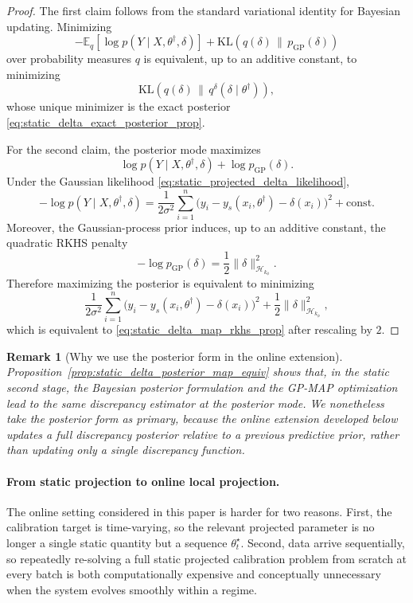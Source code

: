 \documentclass{article}
\newtheorem{remark}{Remark}
\begin{document}
\begin{proof}
The first claim follows from the standard variational identity for Bayesian updating. Minimizing
\[
-
\mathbb E_q[\log p(Y \mid X,\theta^\dagger,\delta)]
+
\mathrm{KL}(q(\delta)\,\|\,p_{\mathrm{GP}}(\delta))
\]
over probability measures $q$ is equivalent, up to an additive constant, to minimizing
\[
\mathrm{KL}\!\left(
q(\delta)\,\|\,q^\delta(\delta \mid \theta^\dagger)
\right),
\]
whose unique minimizer is the exact posterior \eqref{eq:static_delta_exact_posterior_prop}.

For the second claim, the posterior mode maximizes
\[
\log p(Y \mid X,\theta^\dagger,\delta) + \log p_{\mathrm{GP}}(\delta).
\]
Under the Gaussian likelihood \eqref{eq:static_projected_delta_likelihood},
\[
-\log p(Y \mid X,\theta^\dagger,\delta)
=
\frac{1}{2\sigma^2}
\sum_{i=1}^n
\big(
y_i-y_s(x_i,\theta^\dagger)-\delta(x_i)
\big)^2
+\mathrm{const}.
\]
Moreover, the Gaussian-process prior induces, up to an additive constant, the quadratic RKHS penalty
\[
-\log p_{\mathrm{GP}}(\delta)
=
\frac{1}{2}\|\delta\|_{\mathcal H_{k_\phi}}^2.
\]
Therefore maximizing the posterior is equivalent to minimizing
\[
\frac{1}{2\sigma^2}
\sum_{i=1}^n
\big(
y_i-y_s(x_i,\theta^\dagger)-\delta(x_i)
\big)^2
+
\frac{1}{2}\|\delta\|_{\mathcal H_{k_\phi}}^2,
\]
which is equivalent to \eqref{eq:static_delta_map_rkhs_prop} after rescaling by $2$.
\end{proof}

\begin{remark}[Why we use the posterior form in the online extension]
\label{rem:posterior_vs_map_static_online}
Proposition~\ref{prop:static_delta_posterior_map_equiv} shows that, in the static second stage, the Bayesian posterior formulation and the GP-MAP optimization lead to the same discrepancy estimator at the posterior mode. We nonetheless take the posterior form as primary, because the online extension developed below updates a full discrepancy posterior relative to a previous predictive prior, rather than updating only a single discrepancy function.
\end{remark}

\paragraph{From static projection to online local projection.}
The online setting considered in this paper is harder for two reasons. First, the calibration target is time-varying, so the relevant projected parameter is no longer a single static quantity but a sequence $\theta_t^\star$. Second, data arrive sequentially, so repeatedly re-solving a full static projected calibration problem from scratch at every batch is both computationally expensive and conceptually unnecessary when the system evolves smoothly within a regime.
\end{document}
